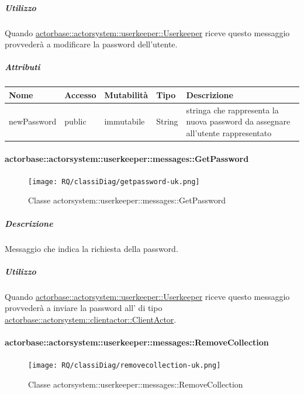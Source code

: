 \documentclass{scalatekids-article}
\begin{document}
\subparagraph{Utilizzo}
Quando \hyperref[sec:actorbase::actorsystem::userkeeper::Userkeeper]{actorbase::\allowbreak{}actorsystem::\allowbreak{}userkeeper::\allowbreak{}Userkeeper}
riceve questo messaggio provvederà a modificare la password dell'utente.

\subparagraph{Attributi}
\begin{tabular}{| p{3cm} | p{1.5cm} | p{2cm} | p{2cm} | p{8.5cm} |}
  \hline
  Nome & Accesso & Mutabilità & Tipo & Descrizione\\
  \hline
  newPassword & public & immutabile & String & stringa che rappresenta la nuova password da assegnare all'utente rappresentato \\
  \hline
\end{tabular}


\paragraph{actorbase::actorsystem::userkeeper::messages::GetPassword}
\label{sec:actorbase::actorsystem::userkeeper::messages::GetPassword}

\begin{figure}[H]
   \begin{center}
     \texttt{[image: RQ/classiDiag/getpassword-uk.png]}
     \caption{Classe actorsystem::userkeeper::messages::GetPassword}
   \end{center}
 \end{figure}

\subparagraph{Descrizione}

Messaggio che indica la richiesta della password.

\subparagraph{Utilizzo}

Quando \hyperref[sec:actorbase::actorsystem::userkeeper::Userkeeper]{actorbase::\allowbreak{}actorsystem::\allowbreak{}userkeeper::\allowbreak{}Userkeeper}
riceve questo messaggio provvederà a inviare la password all' di tipo
\hyperref[sec:actorbase::actorsystem::clientactor::ClientActor]{actorbase::\allowbreak{}actorsystem::\allowbreak{}clientactor::\allowbreak{}ClientActor}.

\paragraph{actorbase::actorsystem::userkeeper::messages::RemoveCollection}
\label{sec:actorbase::actorsystem::userkeeper::messages::RemoveCollection}

\begin{figure}[H]
   \begin{center}
     \texttt{[image: RQ/classiDiag/removecollection-uk.png]}
     \caption{Classe actorsystem::userkeeper::messages::RemoveCollection}
   \end{center}
 \end{figure}
\end{document}
